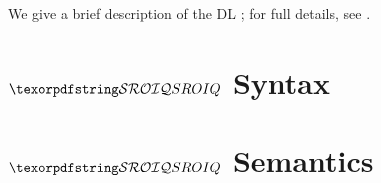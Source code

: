 
We give a brief description of the DL \SROIQ; for full details, see \cite{horrocks2006even,Kazakov08,baader_horrocks_lutz_sattler_2017,rudolph2011foundations}. 

\section{\texorpdfstring{$\SROIQ$}{SROIQ} Syntax} \label{sroiq-syntax-appendix}



\section{\texorpdfstring{$\SROIQ$}{SROIQ} Semantics} \label{sroiq-semantics-appendix}



